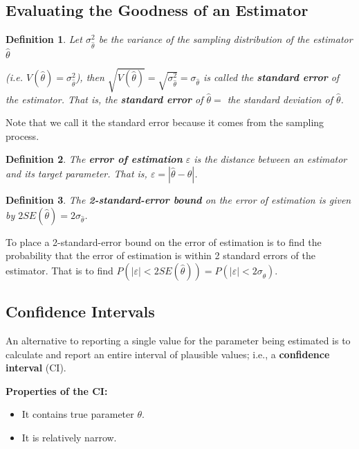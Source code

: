 \documentclass[a4paper,12pt]{article}
\theoremstyle{nonitalic}
\newtheorem{definition}{Definition}[subsection]
\begin{document}
    \subsection{Evaluating the Goodness of an Estimator}

    \begin{definition}
        Let \(\sigma^2_{\hat{\theta}}\) be the variance of the sampling distribution of the estimator \(\hat{\theta}\)

        (i.e. \(V(\hat{\theta}) = \sigma^2_{\hat{\theta}}\)), then \(\sqrt{V(\hat{\theta})} = \sqrt{\sigma^2_{\hat{\theta}}} = \sigma_{\hat{\theta}}\) is called the \textbf{standard error} of the estimator. That is, the \textbf{standard error} of \(\hat{\theta} =\) the standard deviation of \(\hat{\theta}\).
    \end{definition}
    Note that we call it the standard error because it comes from the sampling process.

    \bigskip

    \begin{definition}
        The \textbf{error of estimation} \(\varepsilon\) is the distance between an estimator and its target parameter. That is, \(\varepsilon = |\hat{\theta} - \theta|\).
    \end{definition}

    \bigskip

    \begin{definition}
        The \textbf{2-standard-error bound} on the error of estimation is given by $2SE(\hat{\theta}) = 2\sigma_{\hat{\theta}}$.
    \end{definition}
    To place a 2-standard-error bound on the error of estimation is to find the probability that the error of estimation is within 2 standard errors of the estimator. That is to find $P(|\varepsilon| < 2SE(\hat{\theta})) = P(|\varepsilon| < 2 \sigma_{\hat{\theta}})$.

    \newpage

    \subsection{Confidence Intervals}

    An alternative to reporting a single value for the parameter being estimated is to calculate and report an entire interval of plausible values; i.e., a \textbf{confidence interval} (CI).

    \textbf{Properties of the CI:}

    \begin{itemize}
        \item It contains true parameter \(\theta\).
        \item It is relatively narrow.
    \end{itemize}
\end{document}
